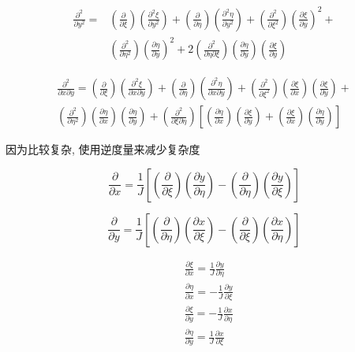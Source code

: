 $$
	\begin{aligned}
		\frac{\partial^{2}}{\partial y^{2}}= & \left(\frac{\partial}{\partial \xi}\right)\left(\frac{\partial^{2} \xi}{\partial y^{2}}\right)+\left(\frac{\partial}{\partial \eta}\right)\left(\frac{\partial^{2} \eta}{\partial y^{2}}\right)+\left(\frac{\partial^{2}}{\partial \xi^{2}}\right)\left(\frac{\partial \xi}{\partial y}\right)^{2}+ \\
		                                     & \left(\frac{\partial^{2}}{\partial \eta^{2}}\right)\left(\frac{\partial \eta}{\partial y}\right)^{2}+2\left(\frac{\partial^{2}}{\partial \eta \partial \xi}\right)\left(\frac{\partial \eta}{\partial y}\right)\left(\frac{\partial \xi}{\partial y}\right)
	\end{aligned}
$$

$$
	\begin{aligned}
		\frac{\partial^{2}}{\partial x \partial y}=\left(\frac{\partial}{\partial \xi}\right)\left(\frac{\partial^{2} \xi}{\partial x \partial y}\right)+\left(\frac{\partial}{\partial \eta}\right)\left(\frac{\partial^{2} \eta}{\partial x \partial y}\right)+\left(\frac{\partial^{2}}{\partial \xi^{2}}\right)\left(\frac{\partial \xi}{\partial x}\right)\left(\frac{\partial \xi}{\partial y}\right)+ \\
		\left(\frac{\partial^{2}}{\partial \eta^{2}}\right)\left(\frac{\partial \eta}{\partial x}\right)\left(\frac{\partial \eta}{\partial y}\right)+\left(\frac{\partial^{2}}{\partial \xi \partial \eta}\right)\left[\left(\frac{\partial \eta}{\partial x}\right)\left(\frac{\partial \xi}{\partial y}\right)+\left(\frac{\partial \xi}{\partial x}\right)\left(\frac{\partial \eta}{\partial y}\right)\right]
	\end{aligned}
$$

因为比较复杂, 使用逆度量来减少复杂度

$$
	\frac{\partial}{\partial x}=\frac{1}{J}\left[\left(\frac{\partial}{\partial \xi}\right)\left(\frac{\partial y}{\partial \eta}\right)-\left(\frac{\partial}{\partial \eta}\right)\left(\frac{\partial y}{\partial \xi}\right)\right]
$$

$$
	\frac{\partial}{\partial y}=\frac{1}{J}\left[\left(\frac{\partial}{\partial \eta}\right)\left(\frac{\partial x}{\partial \xi}\right)-\left(\frac{\partial}{\partial \xi}\right)\left(\frac{\partial x}{\partial \eta}\right)\right]
$$

$$
	\begin{aligned}
		 & \frac{\partial \xi}{\partial x}=\frac{1}{J} \frac{\partial y}{\partial \eta}  \\
		 & \frac{\partial \eta}{\partial x}=-\frac{1}{J} \frac{\partial y}{\partial \xi} \\
		 & \frac{\partial \xi}{\partial y}=-\frac{1}{J} \frac{\partial x}{\partial \eta} \\
		 & \frac{\partial \eta}{\partial y}=\frac{1}{J} \frac{\partial x}{\partial \xi}
	\end{aligned}
$$

